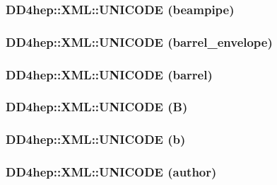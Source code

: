 \label{namespace_d_d4hep_1_1_x_m_l_a956ac5a230a79cf5d08be76044e9cf25}
\hypertarget{namespace_d_d4hep_1_1_x_m_l_a3ccbaea264dfe97079c7eca35c629545}{
\subsubsection[{UNICODE}]{\setlength{\rightskip}{0pt plus 5cm}DD4hep::XML::UNICODE (beampipe)}}
\label{namespace_d_d4hep_1_1_x_m_l_a3ccbaea264dfe97079c7eca35c629545}
\hypertarget{namespace_d_d4hep_1_1_x_m_l_a8a731a0f9270783f7ccc1824c93b53c9}{
\subsubsection[{UNICODE}]{\setlength{\rightskip}{0pt plus 5cm}DD4hep::XML::UNICODE (barrel\_\-envelope)}}
\label{namespace_d_d4hep_1_1_x_m_l_a8a731a0f9270783f7ccc1824c93b53c9}
\hypertarget{namespace_d_d4hep_1_1_x_m_l_acecfc39b8bd7d1ad3f913460455b8c3d}{
\subsubsection[{UNICODE}]{\setlength{\rightskip}{0pt plus 5cm}DD4hep::XML::UNICODE (barrel)}}
\label{namespace_d_d4hep_1_1_x_m_l_acecfc39b8bd7d1ad3f913460455b8c3d}
\hypertarget{namespace_d_d4hep_1_1_x_m_l_aa38b6117dd6cfb7f18a1d8edb53802f9}{
\subsubsection[{UNICODE}]{\setlength{\rightskip}{0pt plus 5cm}DD4hep::XML::UNICODE (B)}}
\label{namespace_d_d4hep_1_1_x_m_l_aa38b6117dd6cfb7f18a1d8edb53802f9}
\hypertarget{namespace_d_d4hep_1_1_x_m_l_a91cdbd4403903a23fc89a3c6f8fbbc1c}{
\subsubsection[{UNICODE}]{\setlength{\rightskip}{0pt plus 5cm}DD4hep::XML::UNICODE (b)}}
\label{namespace_d_d4hep_1_1_x_m_l_a91cdbd4403903a23fc89a3c6f8fbbc1c}
\hypertarget{namespace_d_d4hep_1_1_x_m_l_a68cef4944649864adb3a897b82b74f46}{
\subsubsection[{UNICODE}]{\setlength{\rightskip}{0pt plus 5cm}DD4hep::XML::UNICODE (author)}}
